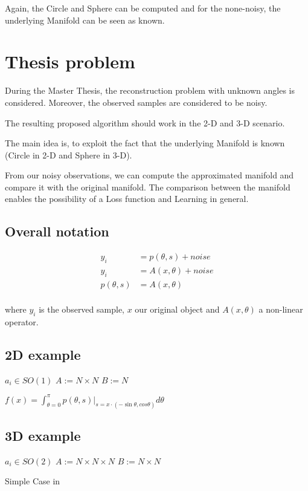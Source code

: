 Again, the Circle and Sphere can be computed and for the none-noisy, the underlying Manifold can be seen as known.


\section{Thesis problem}
During the Master Thesis, the reconstruction problem with unknown angles is considered. 
Moreover, the observed samples are considered to be noisy. 

The resulting proposed algorithm should work in the 2-D and 3-D scenario.

The main idea is, to exploit the fact that the underlying Manifold is known (Circle in 2-D and Sphere in 3-D). 

From our noisy observations, we can compute the approximated manifold and compare it with the original manifold.
The comparison between the manifold enables the possibility of a Loss function and Learning in general.


\subsection{Overall notation}

\begin{equation}
    \begin{aligned}
        y_i &= p(\theta, s) + noise \\
        y_i &= A(x, \theta) + noise \\
        p(\theta, s) &= A(x, \theta) \\
    \end{aligned}
\end{equation}

where $y_i$ is the observed sample, $x$ our original object and $A(x, \theta)$ a non-linear operator.



\subsection{2D example}

$a_i \in SO(1)$
$A := N \times N$
$B := N$

$f(x) = \int_{\theta = 0}^{\pi} p(\theta, s) |_{s=x \cdot (- \sin \theta, cos \theta) } d \theta$



\subsection{3D example}

$a_i \in SO(2)$
$A := N \times N \times N$
$B := N \times N$


Simple Case in 
